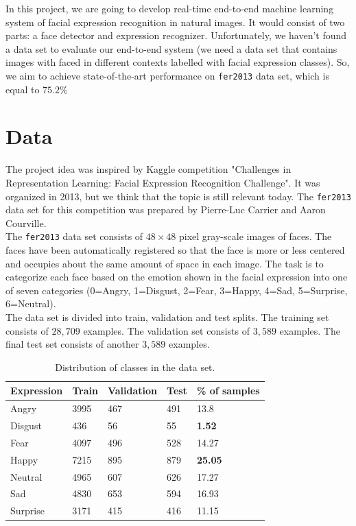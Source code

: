 In this project, we are going to develop real-time end-to-end machine learning system of facial expression recognition in natural images. It would consist of two parts: a face detector and expression recognizer. Unfortunately, we haven't found a data set to evaluate our end-to-end system (we need a data set that contains images with faced in different contexts labelled with facial expression classes). So, we aim to achieve state-of-the-art performance on \texttt{fer2013} data set, which is equal to $75.2\%$

\section{Data}

The project idea was inspired by Kaggle competition "Challenges in Representation Learning: Facial Expression Recognition Challenge". It was organized in 2013, but we think that the topic is still relevant today. The \texttt{fer2013} data set \cite{dataset} for this competition was prepared by Pierre-Luc Carrier and Aaron Courville.\\

The \texttt{fer2013} data set consists of $48\times48$ pixel gray-scale images of faces. The faces have been automatically registered so that the face is more or less centered and occupies about the same amount of space in each image. The task is to categorize each face based on the emotion shown in the facial expression into one of seven categories (0=Angry, 1=Disgust, 2=Fear, 3=Happy, 4=Sad, 5=Surprise, 6=Neutral).\\

The data set is divided into train, validation and test splits. The training set consists of $28,709$ examples. The validation set consists of $3,589$ examples. The final test set consists of another $3,589$ examples.\\

\begin{table}[H]
	\centering
	\begin{tabular}{ | l | l | l | l | l | }
		\hline
		Expression & Train & Validation & Test & \% of samples \\ \hline
		Angry & 3995 & 467 & 491 & 13.8 \\ %
		Disgust & 436 & 56 & 55 & \textbf{1.52} \\ %
		Fear & 4097 & 496 & 528 & 14.27 \\ %
		Happy & 7215 & 895 & 879 & \textbf{25.05} \\ %
		Neutral & 4965 & 607 & 626 & 17.27 \\ %
		Sad & 4830 & 653 & 594 & 16.93 \\ %
		Surprise & 3171 & 415 & 416 & 11.15 \\ 
		\hline
	\end{tabular}
	\caption{Distribution of classes in the data set.}
\end{table}

